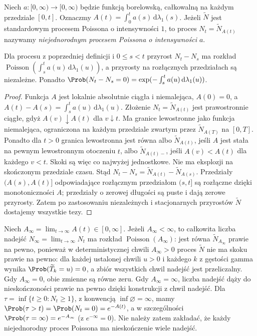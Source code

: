 \begin{definicja}
Niech $a:[0,\infty)\to[0,\infty)$ będzie funkcją borelowską,
całkowalną na każdym przedziale $[0,t]$. Oznaczmy
$A(t)=\int_0^t a(s)\,\mathrm d\lambda_1(s)$.
Jeżeli $\widetilde N$ jest standardowym procesem Poissona
o intensywności $1$, to proces $N_t=\widetilde N_{A(t)}$
nazywamy \emph{niejednorodnym procesem Poissona o intensywności $a$}.
\end{definicja}

\begin{stwierdzenie}
Dla procesu z poprzedniej definicji i $0\le s<t$ przyrost
$N_t-N_s$ ma rozkład
$\operatorname{Poisson}(\int_s^t a(u)\,\mathrm d\lambda_1(u))$, a przyrosty
na rozłącznych przedziałach są niezależne. Ponadto
$\Prob(N_t-N_s=0)=\exp(-\int_s^t a(u)\,\mathrm d\lambda_1(u))$.
\end{stwierdzenie}
\begin{proof}
Funkcja $A$ jest lokalnie absolutnie ciągła i niemalejąca,
$A(0)=0$, a $A(t)-A(s)=\int_s^t a(u)\,\mathrm d\lambda_1(u)$.
Złożenie $N_t=\widetilde N_{A(t)}$ jest prawostronnie
ciągłe, gdyż $A(v)\downarrow A(t)$ dla $v\downarrow t$.
Ma granice lewostronne jako funkcja niemalejąca,
ograniczona na każdym przedziale zwartym przez
$\widetilde N_{A(T)}$ na $[0,T]$. Ponadto dla $t>0$
granica lewostronna jest równa albo $\widetilde N_{A(t)}$,
jeśli $A$ jest stała na pewnym lewostronnym otoczeniu $t$,
albo $\widetilde N_{A(t)-}$, jeśli $A(v)<A(t)$ dla
każdego $v<t$. Skoki są więc co najwyżej jednostkowe.
Nie ma eksplozji na skończonym przedziale czasu.
Stąd $N_t-N_s=\widetilde N_{A(t)}-\widetilde N_{A(s)}$.
Przedziały $(A(s),A(t)]$ odpowiadające rozłącznym
przedziałom $(s,t]$ są rozłączne dzięki monotoniczności
$A$; przedziały o zerowej długości są puste i dają
zerowe przyrosty. Zatem po zastosowaniu
niezależnych i stacjonarnych przyrostów $\widetilde N$
dostajemy wszystkie tezy.
\end{proof}

\begin{uwaga}
Niech $A_\infty=\lim_{t\to\infty}A(t)\in[0,\infty]$.
Jeżeli $A_\infty<\infty$, to całkowita liczba nadejść
$N_\infty=\lim_{t\to\infty}N_t$ ma rozkład
$\operatorname{Poisson}(A_\infty)$: jest równa
$\widetilde N_{A_\infty}$ prawie na pewno, ponieważ
w deterministycznej chwili $A_\infty>0$ proces
$\widetilde N$ nie ma skoku prawie na pewno:
dla każdej ustalonej chwili $u>0$ i każdego $k$
z gęstości gamma wynika
$\Prob(\widetilde T_k=u)=0$, a zbiór wszystkich
chwil nadejść jest przeliczalny.
Gdy $A_\infty=0$, obie zmienne są równe zeru.
Gdy $A_\infty=\infty$, liczba nadejść dąży do nieskończoności
prawie na pewno dzięki konstrukcji z chwil nadejść.
Dla $\tau=\inf\{t\ge0:N_t\ge1\}$, z konwencją
$\inf\varnothing=\infty$, mamy
$\Prob(\tau>t)=\Prob(N_t=0)=e^{-A(t)}$,
a w szczególności $\Prob(\tau=\infty)=e^{-A_\infty}$
(z $e^{-\infty}=0$).
Nie należy zatem zakładać, że każdy niejednorodny
proces Poissona ma nieskończenie wiele nadejść.
\end{uwaga}


